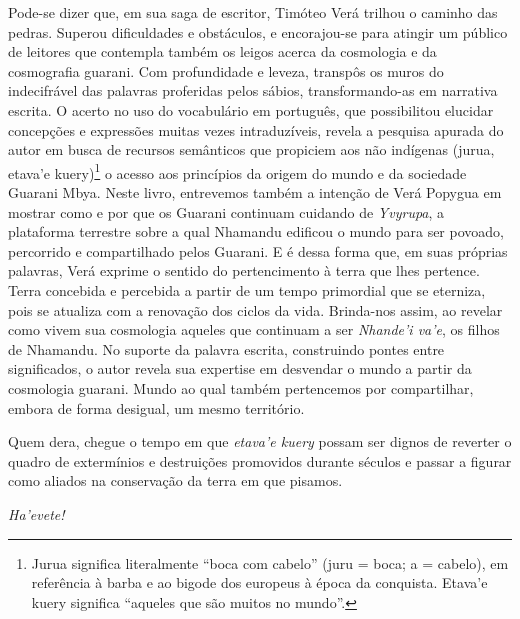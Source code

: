 Pode-se
dizer que, em sua saga de escritor, Timóteo Verá trilhou o caminho das pedras.
Superou dificuldades e obstáculos, e encorajou-se para atingir um público de
leitores que contempla também os leigos acerca da cosmologia e da cosmografia
guarani. Com profundidade e leveza, transpôs os muros do indecifrável das
palavras proferidas pelos sábios, transformando-as em narrativa escrita. O
acerto no uso do vocabulário em português, que possibilitou elucidar concepções
e expressões muitas vezes intraduzíveis, revela a pesquisa apurada do autor em
busca de recursos semânticos que propiciem aos não indígenas (jurua, etava’e
kuery)\footnote{Jurua significa literalmente “boca com cabelo” (juru = boca; a
    = cabelo), em referência à barba e ao bigode dos europeus à época da
    conquista.  Etava’e kuery significa “aqueles que são muitos no mundo”.} o
acesso aos princípios da origem do mundo e da sociedade Guarani Mbya.  Neste
livro, entrevemos também a intenção de Verá Popygua em mostrar como e por que
os Guarani continuam cuidando de \emph{Yvyrupa}, a plataforma terrestre sobre a qual
Nhamandu edificou o mundo para ser povoado, percorrido e compartilhado pelos
Guarani. E é dessa forma que, em suas próprias palavras, Verá exprime o sentido
do pertencimento à terra que lhes pertence. Terra concebida e percebida a
partir de um tempo primordial que se eterniza, pois se atualiza com a renovação
dos ciclos da vida. Brinda-nos assim, ao revelar como vivem sua cosmologia
aqueles que continuam a ser \emph{Nhande’i va’e}, os filhos de Nhamandu.  No suporte
da palavra escrita, construindo pontes entre significados, o autor revela sua
expertise em desvendar o mundo a partir da cosmologia guarani. Mundo ao qual
também pertencemos por compartilhar, embora de forma desigual, um mesmo
território.

Quem dera, chegue o tempo em que \emph{etava’e kuery} possam ser dignos
de reverter o quadro de extermínios e destruições promovidos durante séculos e
passar a figurar como aliados na conservação da terra em que pisamos.


\medskip\hfill\emph{Ha’evete!}
